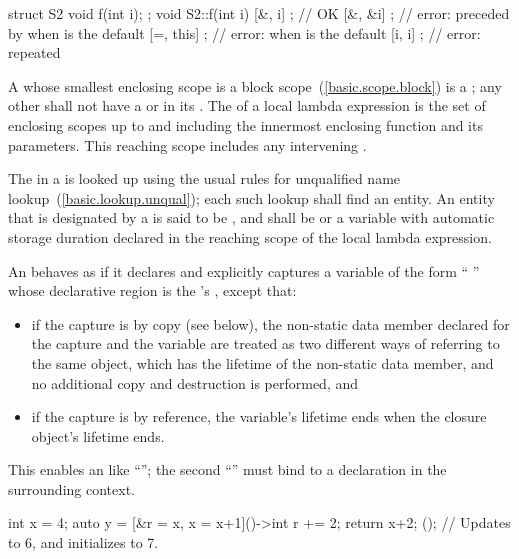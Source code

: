 \begin{codeblock}
struct S2 { void f(int i); };
void S2::f(int i) {
  [&, i]{ };    // OK
  [&, &i]{ };   // error:  preceded by \tcode{\&} when \tcode{\&} is the default
  [=, this]{ }; // error:  when \tcode{=} is the default
  [i, i]{ };    // error:  repeated
}
\end{codeblock}
\exitexample

\pnum
A  whose smallest enclosing scope is a block
scope~(\ref{basic.scope.block}) is a ; any other
 shall not have a  or
 in its
. The  of a local lambda expression
is the set of enclosing scopes up to and including the innermost enclosing function and
its parameters. \enternote This reaching scope includes any intervening
. \exitnote

\pnum
The  in a  is looked up using the
usual rules for unqualified name lookup~(\ref{basic.lookup.unqual}); each such lookup
shall find an entity.  An entity that is designated by a
is said to be , and shall be  or
a variable with automatic storage duration declared in
the reaching scope of the local lambda expression.

\pnum
An  behaves as if it declares and explicitly captures a
variable of
the form ``  \tcode{;}''
whose declarative region is the 's
, except that:
\begin{itemize}
\item if the capture is by copy (see below), the non-static data member
declared for the capture and the variable are treated as two different ways
of referring to the same object, which has the lifetime of the non-static
data member, and no additional copy and destruction is performed, and
\item if the capture is by reference, the variable's lifetime ends when the
closure object's lifetime ends.
\end{itemize}
\enternote
This enables an  like
``''; the second ``'' must bind to a
declaration in the surrounding context.
\exitnote
\enterexample
\begin{codeblock}
int x = 4;
auto y = [&r = x, x = x+1]()->int {
            r += 2;
            return x+2;
         }();  // Updates  to 6, and initializes  to 7.
\end{codeblock}
\exitexample

